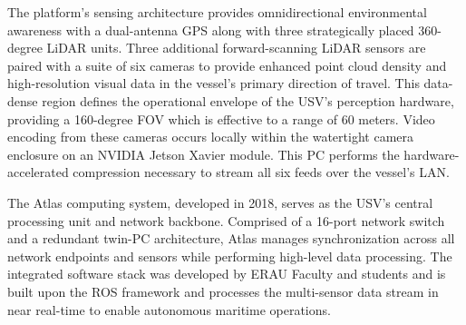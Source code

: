 \documentclass{erauthesis}
\begin{document}
The platform's sensing architecture provides omnidirectional environmental awareness with a dual-antenna \ac{GPS} along with three strategically placed 360-degree \ac{LiDAR} units.
Three additional forward-scanning \ac{LiDAR} sensors are paired with a suite of six cameras to provide enhanced point cloud density and high-resolution visual data in the vessel's primary direction of travel. 
This data-dense region defines the operational envelope of the \ac{USV}'s perception hardware, providing a 160-degree \acl{FOV} which is effective to a range of 60 meters.
Video encoding from these cameras occurs locally within the watertight camera enclosure on an NVIDIA Jetson Xavier module.
This PC performs the hardware-accelerated compression necessary to stream all six feeds over the vessel's \ac{LAN}.

The Atlas computing system, developed in 2018, serves as the \ac{USV}'s central processing unit and network backbone.
Comprised of a 16-port network switch and a redundant twin-PC architecture, Atlas manages synchronization across all network endpoints and sensors while performing high-level data processing.
The integrated software stack was developed by \ac{ERAU} Faculty and students and is built upon the \ac{ROS} framework and processes the multi-sensor data stream in near real-time to enable autonomous maritime operations.

\end{document}
